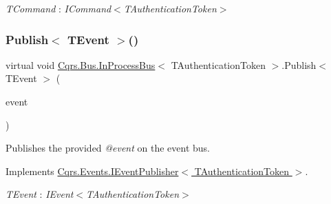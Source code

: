 \begin{Desc}
\item[Type Constraints]\begin{description}
\item[{\em T\+Command} : {\em I\+Command$<$T\+Authentication\+Token$>$}]\end{description}
\end{Desc}
\mbox{\label{classCqrs_1_1Bus_1_1InProcessBus_afd3d41a5f27a985e9d6ccf3f6f77f11a_afd3d41a5f27a985e9d6ccf3f6f77f11a}} 
\subsubsection{\texorpdfstring{Publish$<$ T\+Event $>$()}{Publish< TEvent >()}\hspace{0.1cm}{\footnotesize\ttfamily [1/2]}}
{\footnotesize\ttfamily virtual void \hyperlink{classCqrs_1_1Bus_1_1InProcessBus}{Cqrs.\+Bus.\+In\+Process\+Bus}$<$ T\+Authentication\+Token $>$.Publish$<$ T\+Event $>$ (\begin{DoxyParamCaption}\item[{T\+Event @}]{event }\end{DoxyParamCaption})\hspace{0.3cm}{\ttfamily [virtual]}}



Publishes the provided {\itshape @event}  on the event bus. 



Implements \hyperlink{interfaceCqrs_1_1Events_1_1IEventPublisher_a02f0db0bc9b3aa1c7f766f58f8422ee3_a02f0db0bc9b3aa1c7f766f58f8422ee3}{Cqrs.\+Events.\+I\+Event\+Publisher$<$ T\+Authentication\+Token $>$}.

\begin{Desc}
\item[Type Constraints]\begin{description}
\item[{\em T\+Event} : {\em I\+Event$<$T\+Authentication\+Token$>$}]\end{description}
\end{Desc}
\mbox{\label{classCqrs_1_1Bus_1_1InProcessBus_ae154f274db2a028a6094677d83cc1c74_ae154f274db2a028a6094677d83cc1c74}} 

